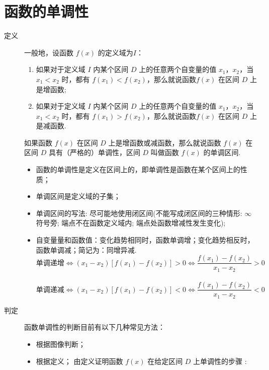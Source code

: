 \section{函数的单调性}
  \begin{description}
    \item [定义] 一般地，设函数 $f(x)$ 的定义域为$I$：
      \begin{enumerate}[label=\arabic*)]
        \item 如果对于定义域 $I$ 内某个区间 $D$ 上的任意两个自变量的值 $x_1$，$x_2$，当 $x_1<x_2$ 时，都有 $f(x_1)<f(x_2)$，那么就说函数$f(x)$ 在区间 $D$ 上是增函数;
        \item 如果对于定义域 $I$ 内某个区间 $D$ 上的任意两个自变量的值 $x_1$，$x_2$，当 $x_1<x_2$ 时，都有 $f(x_1)>f(x_2)$，那么就说函数$f(x)$ 在区间 $D$ 上是减函数.
      \end{enumerate}
      \hspace{2em}如果函数 $f(x)$ 在区间 $D$ 上是增函数或减函数，那么就说函数 $f(x)$ 在区间 $D$ 具有（严格的）单调性，区间 $D$ 叫做函数 $f(x)$ 的单调区间.
      \begin{itemize}[leftmargin=*]
        \kaishu
        \item 函数的单调性是定义在区间上的，即单调性是函数在某个区间上的性质；
        \item 单调区间是定义域的子集；
        \item 单调区间的写法: 尽可能地使用闭区间(不能写成闭区间的三种情形: $\infty$符号旁; 端点不在函数定义域内; 端点处函数增减性发生变化);
        \item 自变量量和函数值：变化趋势相同时，函数单调增；变化趋势相反时，函数单调减；简记为：同增异减.\\\vspace{-8pt}
        $$\text{单调递增}\Leftrightarrow(
        x_1-x_2)[f(x_1)-f(x_2)]>0\Leftrightarrow \dfrac{f(x_1)-f(x_2)}{x_1-x_2}>0$$\\\vspace{-24pt}
        $$\text{单调递减}\Leftrightarrow(x_1-x_2)[f(x_1)-f(x_2)]<0\Leftrightarrow \dfrac{f(x_1)-f(x_2)}{x_1-x_2}<0$$
      \end{itemize}
    \item [判定] 函数单调性的判断目前有以下几种常见方法：
    \begin{itemize}[leftmargin=*]
      \item 根据图像判断；
      \item 根据定义；
        由定义证明函数 $f(x)$ 在给定区间 $D$ 上单调性的步骤 :\\

\end{itemize}
\end{description}

